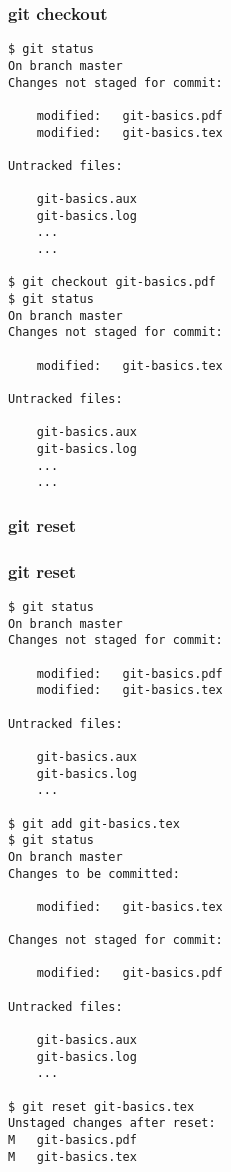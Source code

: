 \documentclass{beamer}
\begin{document}
\begin{frame}[fragile]
\frametitle{git checkout}
	\tiny
	\begin{verbatim}
$ git status
On branch master
Changes not staged for commit:

	modified:   git-basics.pdf
	modified:   git-basics.tex

Untracked files:

	git-basics.aux
	git-basics.log
	...
	...

$ git checkout git-basics.pdf
$ git status
On branch master
Changes not staged for commit:

	modified:   git-basics.tex

Untracked files:

	git-basics.aux
	git-basics.log
	...
	...

	\end{verbatim}
\end{frame}


\begin{frame}
\frametitle{git reset}

\end{frame}


\begin{frame}[fragile]
\frametitle{git reset}
	\tiny
	\begin{verbatim}
$ git status
On branch master
Changes not staged for commit:

	modified:   git-basics.pdf
	modified:   git-basics.tex

Untracked files:

	git-basics.aux
	git-basics.log
	...

$ git add git-basics.tex
$ git status
On branch master
Changes to be committed:

	modified:   git-basics.tex

Changes not staged for commit:

	modified:   git-basics.pdf

Untracked files:

	git-basics.aux
	git-basics.log
	...

$ git reset git-basics.tex
Unstaged changes after reset:
M	git-basics.pdf
M	git-basics.tex
	\end{verbatim}
\end{frame}
\end{document}
